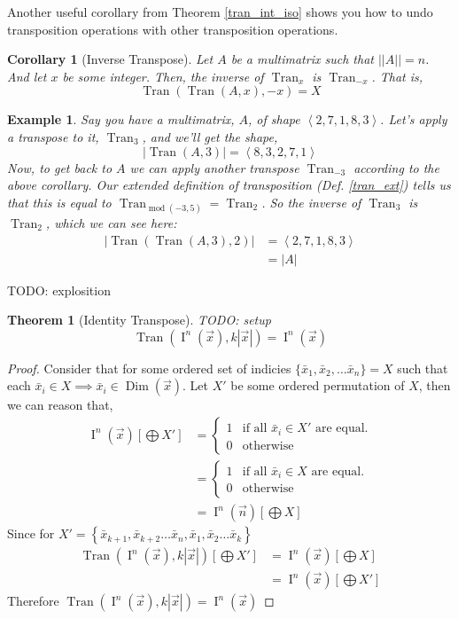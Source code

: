 \documentclass[12pt]{book}
\theoremstyle{definition}
\theoremstyle{plain}
\newtheorem{theorem}{Theorem}[chapter]
\newtheorem{corollary}{Corollary}[theorem]
\newtheorem{example}{Example}[chapter]
\theoremstyle{ppart}
\theoremstyle{case}
\theoremstyle{solution}
\DeclareMathOperator{\Dim}{Dim}
\DeclareMathOperator{\Ident}{I}
\DeclareMathOperator{\Tran}{Tran}
\DeclareMathOperator{\remainder}{mod}
\begin{document}
Another useful corollary from Theorem \ref{tran_int_iso} shows you how to
undo transposition operations with other transposition operations.

\begin{corollary}[Inverse Transpose]
Let $A$ be a multimatrix such that $||A|| = n$. And let
$x$ be some integer. Then, the inverse of $\Tran_x$ is
$\Tran_{-x}$. That is,
\[ \Tran(\Tran(A, x), -x) = X \]
\end{corollary}

\begin{example}
Say you have a multimatrix, $A$, of shape $\left<2,7,1,8,3\right>$.
Let's apply a transpose to it, $\Tran_3$, and we'll get the shape,
\[ |\Tran(A, 3)| = \left<8,3,2,7,1\right> \]
Now, to get back to $A$ we can apply another transpose $\Tran_{-3}$ according
to the above corollary.
Our extended definition of transposition (Def. \ref{tran_ext})
tells us that this is equal to $\Tran_{\remainder(-3, 5)} = \Tran_{2}$.
So the inverse of $\Tran_3$ is $\Tran_2$, which we can see here:
\begin{align*}
  |\Tran(\Tran(A, 3), 2)|
  &= \left<2,7,1,8,3\right> \\
  &= |A|
\end{align*}
\end{example}

TODO: explosition

\begin{theorem}[Identity Transpose]
TODO: setup
\[ \Tran(\Ident^n(\vec{x}), k|\vec{x}|) = \Ident^n(\vec{x}) \]
\end{theorem}
\begin{proof}
Consider that for some ordered set of indicies
$\{\bar{x}_1, \bar{x}_2, \ldots \bar{x}_n\} = X$ such that each
$\bar{x}_i \in X \implies \bar{x}_i \in \Dim(\vec{x})$.
Let $X'$ be some ordered permutation of $X$, then we can reason that,
\begin{align*}
 \Ident^n(\vec{x})\left[\bigoplus X'\right]
 &= 
	\left\{
  \begin{array}{ll}
    1 & \mbox{if all } \bar{x}_i \in X' \mbox{ are equal.}\\
    0 & \mbox{otherwise}
  \end{array}
	\right.\\
 &= 
	\left\{
  \begin{array}{ll}
    1 & \mbox{if all } \bar{x}_i \in X \mbox{ are equal.}\\
    0 & \mbox{otherwise}
  \end{array}
	\right.\\
 &=\Ident^n(\vec{n})\left[\bigoplus X\right]
\end{align*}
Since for
$X' = \left\{\bar{x}_{k+1}, \bar{x}_{k+2} \ldots \bar{x}_{n},
\bar{x}_1, \bar{x}_2 \ldots \bar{x}_k\right\}$
\begin{align*}
  \Tran(\Ident^n(\vec{x}), k|\vec{x}|)\left[\bigoplus X'\right]
	&=
  \Ident^n(\vec{x})\left[\bigoplus X\right]\\
	&=
  \Ident^n(\vec{x})\left[\bigoplus X'\right]
\end{align*}
Therefore
$\Tran(\Ident^n(\vec{x}), k|\vec{x}|) = \Ident^n(\vec{x})$
\end{proof}
\end{document}
